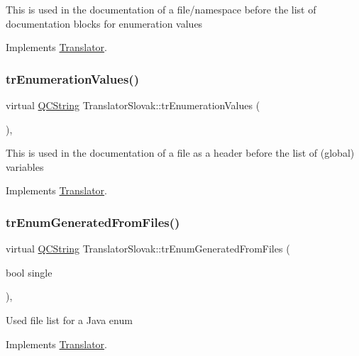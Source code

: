 This is used in the documentation of a file/namespace before the list of documentation blocks for enumeration values 

Implements \mbox{\hyperlink{class_translator}{Translator}}.

\mbox{\label{class_translator_slovak_a7caed8423adb93eaeb9eb391570265b1}} 
\subsubsection{\texorpdfstring{trEnumerationValues()}{trEnumerationValues()}}
{\footnotesize\ttfamily virtual \mbox{\hyperlink{class_q_c_string}{Q\+C\+String}} Translator\+Slovak\+::tr\+Enumeration\+Values (\begin{DoxyParamCaption}{ }\end{DoxyParamCaption})\hspace{0.3cm}{\ttfamily [inline]}, {\ttfamily [virtual]}}

This is used in the documentation of a file as a header before the list of (global) variables 

Implements \mbox{\hyperlink{class_translator}{Translator}}.

\mbox{\label{class_translator_slovak_a6c65e83107c36393bb859837916e1d2e}} 
\subsubsection{\texorpdfstring{trEnumGeneratedFromFiles()}{trEnumGeneratedFromFiles()}}
{\footnotesize\ttfamily virtual \mbox{\hyperlink{class_q_c_string}{Q\+C\+String}} Translator\+Slovak\+::tr\+Enum\+Generated\+From\+Files (\begin{DoxyParamCaption}\item[{bool}]{single }\end{DoxyParamCaption})\hspace{0.3cm}{\ttfamily [inline]}, {\ttfamily [virtual]}}

Used file list for a Java enum 

Implements \mbox{\hyperlink{class_translator}{Translator}}.


